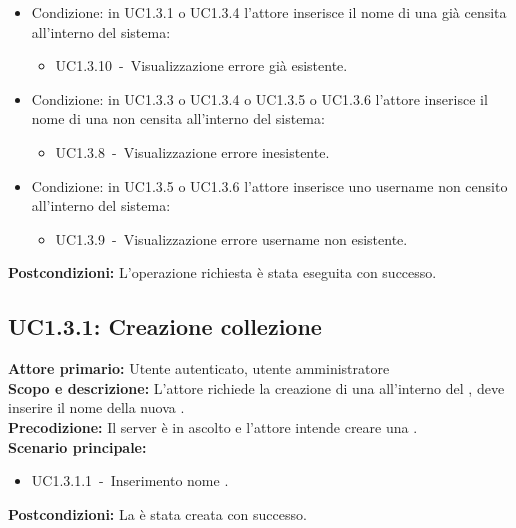 \documentclass{scalatekids-article}
\begin{document}
\begin{itemize}
\item Condizione: in UC1.3.1 o UC1.3.4 l'attore inserisce il nome di una  già censita all'interno del sistema:
  \begin{itemize}
  \item UC1.3.10\ -\ Visualizzazione errore  già esistente.
  \end{itemize}
\item Condizione: in UC1.3.3 o UC1.3.4 o UC1.3.5 o UC1.3.6 l'attore inserisce il nome di una  non censita all'interno del sistema:
  \begin{itemize}
  \item UC1.3.8\ -\ Visualizzazione errore  inesistente.
  \end{itemize}
\item Condizione: in UC1.3.5 o UC1.3.6 l'attore inserisce uno username non censito all'interno del sistema:
  \begin{itemize}
  \item UC1.3.9\ -\ Visualizzazione errore username non esistente.
  \end{itemize}
\end{itemize}
\textbf{Postcondizioni:} L'operazione richiesta è stata eseguita con successo.

\subsection{UC1.3.1: Creazione collezione}

\textbf{Attore primario:} Utente autenticato, utente amministratore\\
\textbf{Scopo e descrizione:} L'attore richiede la creazione di una  all'interno del , deve inserire il nome della nuova .\\
\textbf{Precodizione:} Il server è in ascolto e l'attore intende creare una .\\
\textbf{Scenario principale:}
\begin{itemize}
\item UC1.3.1.1\ -\ Inserimento nome .
\end{itemize}
\textbf{Postcondizioni:} La  è stata creata con successo.
\end{document}
